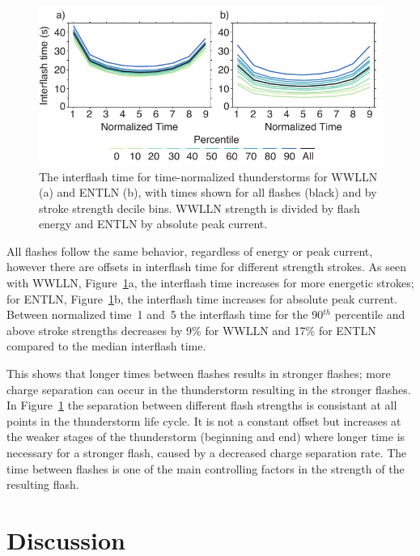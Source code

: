 \begin{figure}[ht!]
   \centering
   \includegraphics[scale=1]{thunderstorm/Figures/stormTimeRate.pdf}
   \caption{The interflash time for time-normalized thunderstorms for WWLLN (a) and ENTLN (b), with times shown for all flashes (black) and by stroke strength decile bins.
     WWLLN strength is divided by flash energy and ENTLN by absolute peak current.}
   \label{thunderstorm:fig:timerate}
\end{figure}

All flashes follow the same behavior, regardless of energy or peak current, however there are offsets in interflash time for different strength strokes.
As seen with WWLLN, Figure~\ref{thunderstorm:fig:timerate}a, the interflash time increases for more energetic strokes; for ENTLN, Figure~\ref{thunderstorm:fig:timerate}b, the interflash time increases for absolute peak current.
Between normalized time~1 and~5 the interflash time for the 90$^{th}$ percentile and above stroke strengths decreases by 9\% for WWLLN and 17\% for ENTLN compared to the median interflash time.

This shows that longer times between flashes results in stronger flashes; more charge separation can occur in the thunderstorm resulting in the stronger flashes.
In Figure~\ref{thunderstorm:fig:timerate} the separation between different flash strengths is consistant at all points in the thunderstorm life cycle.
It is not a constant offset but increases at the weaker stages of the thunderstorm (beginning and end) where longer time is necessary for a stronger flash, caused by a decreased charge separation rate.
The time between flashes is one of the main controlling factors in the strength of the resulting flash.

\section{Discussion}

